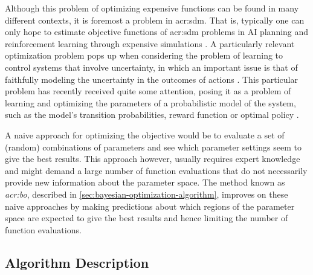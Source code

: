 Although this problem of optimizing expensive functions can be found in many different contexts, it is foremost a problem in \acrshort{acr:sdm}. 
That is, typically one can only hope to estimate objective functions of \acrshort{acr:sdm} problems in AI planning and reinforcement learning through expensive simulations \cite{Brochu2010}. 
A particularly relevant optimization problem pops up when considering the problem of learning to control systems that involve uncertainty, in which an important issue is that of faithfully modeling the uncertainty in the outcomes of actions \cite{Ghahramani2015}.
This particular problem has recently received quite some attention, posing it as a problem of learning and optimizing the parameters of a probabilistic model of the system, such as the model's transition probabilities, reward function or optimal policy \cite{Poupart2010}.

A naive approach for optimizing the objective would be to evaluate a set of (random) combinations of parameters and see which parameter settings seem to give the best results.
This approach however, usually requires expert knowledge and might demand a large number of function evaluations that do not necessarily provide new information about the parameter space.
The method known as \textit{\acrlong{acr:bo}}, described in \autoref{sec:bayesian-optimization-algorithm}, improves on these naive approaches by making predictions about which regions of the parameter space are expected to give the best results and hence limiting the number of function evaluations.

\subsection{Algorithm Description}
\label{sec:bayesian-optimization-algorithm}

